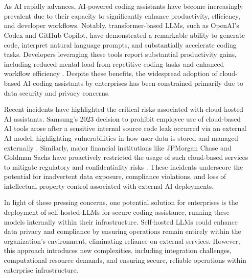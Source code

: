 \chapter{}%
\label{ch:inleiding}

As \gls{AI} rapidly advances, \gls{AI}-powered coding assistants have become increasingly prevalent due to their capacity to significantly enhance productivity, efficiency, and developer workflows. Notably, transformer-based \glspl{LLM}, such as OpenAI's Codex and GitHub Copilot, have demonstrated a remarkable ability to generate code, interpret natural language prompts, and substantially accelerate coding tasks. Developers leveraging these tools report substantial productivity gains, including reduced mental load from repetitive coding tasks and enhanced workflow efficiency \autocite{Microsoft2023Copilot}. Despite these benefits, the widespread adoption of cloud-based \gls{AI} coding assistants by enterprises has been constrained primarily due to data security and privacy concerns.

Recent incidents have highlighted the critical risks associated with cloud-hosted \gls{AI} assistants. Samsung's 2023 decision to prohibit employee use of cloud-based \gls{AI} tools arose after a sensitive internal source code leak occurred via an external \gls{AI} model, highlighting vulnerabilities in how user data is stored and managed externally \autocite{Park2023Samsung}. Similarly, major financial institutions like JPMorgan Chase and Goldman Sachs have proactively restricted the usage of such cloud-based services to mitigate regulatory and confidentiality risks \autocite{Kessel2024}. These incidents underscore the potential for inadvertent data exposure, compliance violations, and loss of intellectual property control associated with external \gls{AI} deployments.

In light of these pressing concerns, one potential solution for enterprises is the deployment of self-hosted \glspl{LLM} for secure coding assistance, running these models internally within their infrastructure. Self-hosted \glspl{LLM} could enhance data privacy and compliance by ensuring operations remain entirely within the organization's environment, eliminating reliance on external services. However, this approach introduces new complexities, including integration challenges, computational resource demands, and ensuring secure, reliable operations within enterprise infrastructure.

